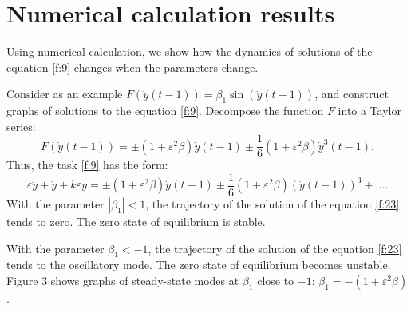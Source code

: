 \documentclass[12pt]{article} %
\newcommand{\eps}{\varepsilon}
\begin{document}
\newpage

\section{Numerical calculation results}

Using numerical calculation, we show how the dynamics of solutions of the equation \eqref{f:9} changes when the parameters change.

Consider as an example $F(\dot{y}(t-1))=\beta_1\sin(\dot{y}(t-1))$, and construct graphs of solutions to the equation \eqref{f:9}. Decompose the function $F$ into a Taylor series:
\[
F(\dot{y}(t-1))=\pm(1+\eps^2\beta)\dot{y}(t-1)\pm\dfrac{1}{6}(1+\eps^2\beta)\dot{y}^{3}(t-1).
\]
Thus, the task \eqref{f:9} has the form:
\begin{equation}
\eps\ddot{y}+\dot{y}+k\eps y=\pm(1+\eps^2\beta)\dot{y}(t-1)\pm\displaystyle\frac{1}{6}(1+\eps^2\beta)(\dot{y}(t-1))^3+\ldots.
\label{f:23}
\end{equation}
With the parameter $|\beta_1|<1$, the trajectory of the solution of the equation \eqref{f:23} tends to zero. The zero state of equilibrium is stable.

With the parameter $\beta_1<-1$, the trajectory of the solution of the equation \eqref{f:23} tends to the oscillatory mode. The zero state of equilibrium becomes unstable. Figure 3 shows graphs of steady-state modes at $\beta_1$ close to $-1$: $\beta_1=-(1+\eps^2\beta)$.
\end{document}
